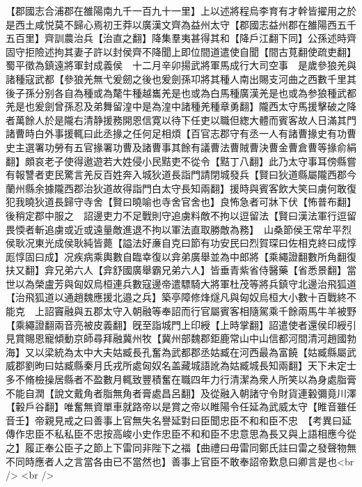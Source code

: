 【郡國志合浦郡在雒陽南九千一百九十一里】上以述將程烏李育有才幹皆擢用之於是西土咸悦莫不歸心焉初王莽以廣漢文齊為益州太守【郡國志益州郡在雒陽西五千五百里】齊訓農治兵【治直之翻】降集羣夷甚得其和【降戶江翻下同】公孫述時齊固守拒險述拘其妻子許以封侯齊不降聞上即位間道遣使自聞【間古莧翻使疏吏翻】蜀平徵為鎮遠將軍封成義侯　十二月辛卯揚武將軍馬成行大司空事　是歲參狼羌與諸種寇武都【參狼羌無弋爰劒之後也爰劍孫卭將其種人南出賜支河曲之西數千里其後子孫分别各自為種或為氂牛種越巂羌是也或為白馬種廣漢羌是也或為参狼種武都羌是也爰劍曾孫忍及弟舞留湟中是為湟中諸種羌種章勇翻】隴西太守馬援擊破之降者萬餘人於是隴右清静援務開恩信寛以待下任吏以職但緫大體而賓客故人日滿其門諸曹時白外事援輒曰此丞掾之任何足相煩【百官志郡守有丞一人有諸曹掾史有功曹史主選署功勞有五官掾署功曹及諸曹事其餘有議曹法曹賊曹決曹金曹倉曹等掾俞絹翻】頗哀老子使得遨遊若大姓侵小民黠吏不從令【黠丁八翻】此乃太守事耳傍縣嘗有報讐者吏民驚言羌反百姓奔入城狄道長詣門請閉城發兵【賢曰狄道縣屬隴西郡今蘭州縣余據隴西郡治狄道故得詣門白太守長知兩翻】援時與賓客飲大笑曰虜何敢復犯我曉狄道長歸守寺舍【賢曰曉喻也寺舍官舍也】良怖急者可牀下伏【怖普布翻】後稍定郡中服之　詔邊吏力不足戰則守追虜料敵不拘以逗留法【賢曰漢法軍行逗留畏愞者斬追虜或近或遠量敵進退不拘以軍法直取勝敵為務】　山桑節侯王常牟平烈侯耿况東光成侯耿純皆薨【謚法好亷自克曰節有功安民曰烈賀琛曰佐相克終曰成惇厖惇固曰成】况疾病乘輿數自臨幸復以弇弟廣舉並為中郎將【乘繩證翻數所角翻復扶又翻】弇兄弟六人【弇舒國廣舉霸兄弟六人】皆垂青紫省侍醫藥【省悉景翻】當世以為榮盧芳與匈奴烏桓連兵數寇邊帝遣驃騎大將軍杜茂等將兵鎮守北邊治飛狐道【治飛狐道以通趙魏應援北邉之兵】築亭障修烽燧凡與匈奴烏桓大小數十百戰終不能克　上詔竇融與五郡太守入朝融等奉詔而行官屬賓客相隨駕乘千餘兩馬牛羊被野【乘繩證翻兩音亮被皮義翻】旣至詣城門上印綬【上時掌翻】詔遣使者還侯印綬引見賞賜恩寵傾動京師尋拜融冀州牧【冀州部魏郡鉅鹿常山中山信都河間清河趙國勃海】又以梁統為太中大夫姑臧長孔奮為武都郡丞姑臧在河西最為富饒【姑臧縣屬武威郡劉昫曰姑臧縣秦月氏戎所處匈奴名盖藏城語訛為姑臧城長知兩翻】天下未定士多不脩檢操居縣者不盈數月輒致豐積奮在職四年力行清潔為衆人所笑以為身處脂膏不能自潤【說文戴角者脂無角者膏處昌呂翻】及從融入朝諸守令財貨連轂彌竟川澤【轂戶谷翻】唯奮無資單車就路帝以是賞之帝以睢陽令任延為武威太守【睢音雖任音壬】帝親見戒之曰善事上官無失名譽延對曰臣聞忠臣不和和臣不忠　【考異曰延傳作忠臣不私私臣不忠按高峻小史作忠臣不和和臣不忠意思為長又與上語相應今從之】履正奉公臣子之節上下雷同非陛下之福【曲禮曰毋雷同鄭氏註曰雷之發聲物無不同時應者人之言當各由已不當然也】善事上官臣不敢奉詔帝歎息曰卿言是也<br />
<br />
